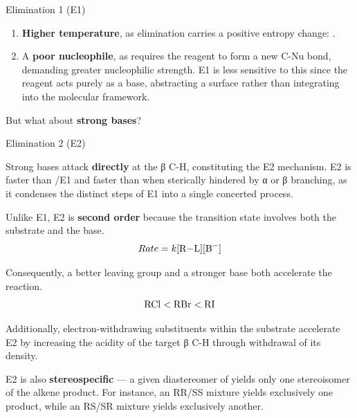 \documentclass[10pt]{article}
\begin{document}
\begin{core}{Elimination 1 (E1)}
\begin{enumerate}
      \item \textbf{Higher temperature}, as elimination carries a positive entropy change: .

      \item A \textbf{poor nucleophile}, as \sno requires the reagent to form a new C-Nu bond, demanding greater nucleophilic strength. E1 is less sensitive to this since the reagent acts purely as a base, abstracting a surface  rather than integrating into the molecular framework.
        
    \end{enumerate}

    But what about \textbf{strong bases}?

  \end{core}

  \begin{core}{Elimination 2 (E2)}

    Strong bases attack  \textbf{directly} at the β C-H, constituting the E2 mechanism. E2 is faster than \sno/E1 and faster than \snt when sterically hindered by α or β branching, as it condenses the distinct steps of E1 into a single concerted process.


    Unlike E1, E2 is \textbf{second order} because the transition state involves both the substrate and the base.
    \[
      Rate = k[\ce{R-L}][\ce{B-}]
    \]

    Consequently, a better leaving group and a stronger base both accelerate the reaction.
    \[
      \ce{RCl} < \ce{RBr} < \ce{RI}
    \]

    Additionally, electron-withdrawing substituents within the substrate accelerate E2 by increasing the acidity of the target β C-H through withdrawal of its  density.


    E2 is also \textbf{stereospecific} --- a given diastereomer of  yields only one stereoisomer of the alkene product. For instance, an RR/SS mixture yields exclusively one product, while an RS/SR mixture yields exclusively another.


\end{core}
\end{document}
